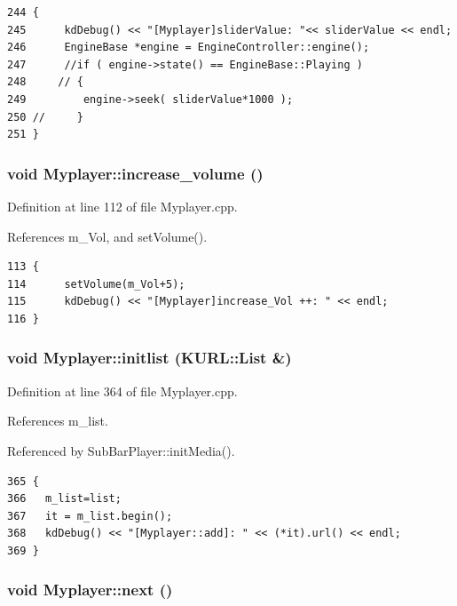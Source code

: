 \footnotesize\begin{verbatim}244 {
245      kdDebug() << "[Myplayer]sliderValue: "<< sliderValue << endl;
246      EngineBase *engine = EngineController::engine();
247      //if ( engine->state() == EngineBase::Playing )
248     // {
249         engine->seek( sliderValue*1000 );
250 //     }
251 }
\end{verbatim}\normalsize 
{}
\subsubsection{\setlength{\rightskip}{0pt plus 5cm}void Myplayer::increase\_\-volume ()\hspace{0.3cm}{\tt  [slot]}}\label{classMyplayer_Myplayeri6}




Definition at line 112 of file Myplayer.cpp.

References m\_\-Vol, and set\-Volume().



\footnotesize\begin{verbatim}113 {
114      setVolume(m_Vol+5);        
115      kdDebug() << "[Myplayer]increase_Vol ++: " << endl;
116 }
\end{verbatim}\normalsize 
{}
\subsubsection{\setlength{\rightskip}{0pt plus 5cm}void Myplayer::initlist (KURL::List \&)\hspace{0.3cm}{\tt  [slot]}}\label{classMyplayer_Myplayeri16}




Definition at line 364 of file Myplayer.cpp.

References m\_\-list.

Referenced by Sub\-Bar\-Player::init\-Media().



\footnotesize\begin{verbatim}365 {
366   m_list=list;
367   it = m_list.begin();
368   kdDebug() << "[Myplayer::add]: " << (*it).url() << endl;
369 }
\end{verbatim}\normalsize 
{}
\subsubsection{\setlength{\rightskip}{0pt plus 5cm}void Myplayer::next ()\hspace{0.3cm}{\tt  [slot]}}\label{classMyplayer_Myplayeri4}




